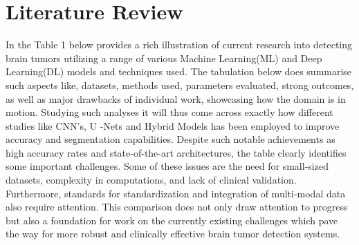 \documentclass[conference]{IEEEtran}
\begin{document}
\section{Literature Review}

In the Table 1 below provides a rich illustration of current research into detecting brain tumors utilizing a range of various
Machine Learning(ML) and Deep Learning(DL) models and
techniques used. The tabulation below does summarise such aspects like,
datasets, methods used, parameters evaluated, strong outcomes,
as well as major drawbacks of individual work, showcasing how the domain
is in motion. Studying such analyses it will thus come across exactly how different studies like CNN's, U -Nets and Hybrid Models has been employed to improve accuracy and segmentation capabilities. Despite such notable achievements as high accuracy rates and state-of-the-art architectures, the table clearly identifies some important challenges. Some of these issues are the need for small-sized datasets, complexity in computations, and lack of clinical validation. Furthermore, standards for standardization and integration of multi-modal data also require attention. This comparison does not only draw attention to progress but also a foundation for work on the currently existing challenges which pave the way
for more robust and clinically effective brain tumor detection systems.
\end{document}
